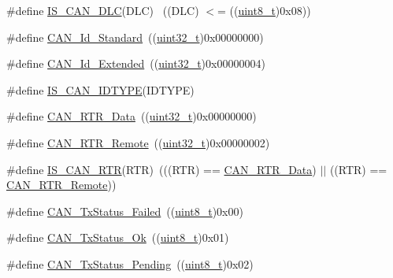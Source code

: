 \begin{DoxyCompactItemize}
\item 
\#define \hyperlink{group___c_a_n___tx_gacb5ffd01496394e97ac30f0cb084a4fe}{I\+S\+\_\+\+C\+A\+N\+\_\+\+D\+LC}(D\+LC)          ~((D\+LC) $<$= ((\hyperlink{_p_e___types_8h_aba7bc1797add20fe3efdf37ced1182c5}{uint8\+\_\+t})0x08))
\item 
\#define \hyperlink{group___c_a_n__identifier__type_ga151d9df8a6f361d0a3231593726b5a13}{C\+A\+N\+\_\+\+Id\+\_\+\+Standard}~((\hyperlink{_p_e___types_8h_a33594304e786b158f3fb30289278f5af}{uint32\+\_\+t})0x00000000)
\item 
\#define \hyperlink{group___c_a_n__identifier__type_gaf6c5c0b43b968fed17fd90246912b1a7}{C\+A\+N\+\_\+\+Id\+\_\+\+Extended}~((\hyperlink{_p_e___types_8h_a33594304e786b158f3fb30289278f5af}{uint32\+\_\+t})0x00000004)
\item 
\#define \hyperlink{group___c_a_n__identifier__type_gab845f7fbcf6ff8cf3d025210eb8900e4}{I\+S\+\_\+\+C\+A\+N\+\_\+\+I\+D\+T\+Y\+PE}(I\+D\+T\+Y\+PE)
\item 
\#define \hyperlink{group___c_a_n__remote__transmission__request_ga2407c3a8b2cd97bd651143aa959219f1}{C\+A\+N\+\_\+\+R\+T\+R\+\_\+\+Data}~((\hyperlink{_p_e___types_8h_a33594304e786b158f3fb30289278f5af}{uint32\+\_\+t})0x00000000)
\item 
\#define \hyperlink{group___c_a_n__remote__transmission__request_ga42e95ddfb02d88c82de84058fb0fb349}{C\+A\+N\+\_\+\+R\+T\+R\+\_\+\+Remote}~((\hyperlink{_p_e___types_8h_a33594304e786b158f3fb30289278f5af}{uint32\+\_\+t})0x00000002)
\item 
\#define \hyperlink{group___c_a_n__remote__transmission__request_ga3379997ad4da6fc4d7975c52b891bdc0}{I\+S\+\_\+\+C\+A\+N\+\_\+\+R\+TR}(R\+TR)~(((R\+TR) == \hyperlink{group___c_a_n__remote__transmission__request_ga2407c3a8b2cd97bd651143aa959219f1}{C\+A\+N\+\_\+\+R\+T\+R\+\_\+\+Data}) $\vert$$\vert$ ((R\+TR) == \hyperlink{group___c_a_n__remote__transmission__request_ga42e95ddfb02d88c82de84058fb0fb349}{C\+A\+N\+\_\+\+R\+T\+R\+\_\+\+Remote}))
\item 
\#define \hyperlink{group___c_a_n__transmit__constants_ga8d193002e76c04ec8caff6b110cd5983}{C\+A\+N\+\_\+\+Tx\+Status\+\_\+\+Failed}~((\hyperlink{_p_e___types_8h_aba7bc1797add20fe3efdf37ced1182c5}{uint8\+\_\+t})0x00)
\item 
\#define \hyperlink{group___c_a_n__transmit__constants_ga0b401c61922b1449de9b486dcf475c97}{C\+A\+N\+\_\+\+Tx\+Status\+\_\+\+Ok}~((\hyperlink{_p_e___types_8h_aba7bc1797add20fe3efdf37ced1182c5}{uint8\+\_\+t})0x01)
\item 
\#define \hyperlink{group___c_a_n__transmit__constants_ga9678a3a51379422868083608c7394409}{C\+A\+N\+\_\+\+Tx\+Status\+\_\+\+Pending}~((\hyperlink{_p_e___types_8h_aba7bc1797add20fe3efdf37ced1182c5}{uint8\+\_\+t})0x02)
$$
\end{DoxyCompactItemize}
